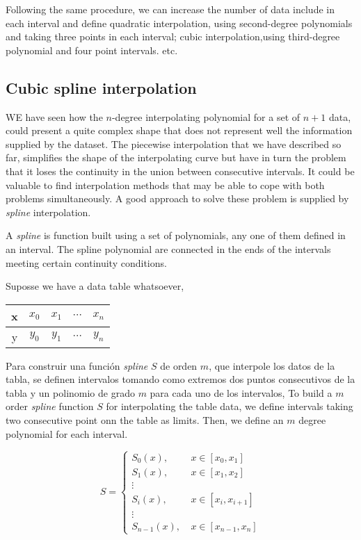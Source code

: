 \begin{paracol}{2}
Following the same procedure, we can increase the number of data include in each interval and define quadratic interpolation, using second-degree polynomials and taking three points in each interval; cubic interpolation,using  third-degree polynomial and four point intervals. etc.

\subsection{Cubic spline interpolation}
WE have seen how the $n$-degree interpolating polynomial for a set of $n+1$ data, could present a quite complex shape that does not represent well the information supplied by the dataset. The piecewise interpolation that we have described so far, simplifies the shape of the interpolating curve but have in turn the problem that it loses the continuity in the union between consecutive intervals. It could be valuable to find interpolation methods that may be able to cope with both problems simultaneously. A good approach to solve these problem is supplied by \emph{spline} interpolation. 

A \emph{spline} is function built using a set of polynomials, any one of them defined in an interval. The spline polynomial are connected in the ends of the intervals meeting certain continuity conditions.

Suposse we have a data table whatsoever,
\end{paracol}
\begin{table}[h]
\centering
\begin{tabular}{c|cccc}
x&$x_0$&$x_1$&$\cdots$&$x_n$\\
\hline
y&$y_0$&$y_1$&$\cdots$&$y_n$
\end{tabular}
\end{table}
\begin{paracol}{2}
Para construir una función \emph{spline} $S$ de orden $m$, que interpole los datos de la tabla, se definen intervalos tomando como extremos dos puntos consecutivos de la tabla y un polinomio de grado $m$ para cada uno de los intervalos,
\switchcolumn
To build a $m$ order \emph{spline} function $S$ for interpolating the table data, we define intervals taking two consecutive point onn the table as limits. Then, we define an $m$ degree polynomial for each interval.
\end{paracol}
\begin{equation*}
S= \left\{ 
\begin{aligned}
S_0(x),& \ x\in [x_0,x_1]\\
S_1(x),& \ x\in [x_1,x_2]\\
\vdots \\
S_i(x),& \ x\in [x_i,x_{i+1}]\\
\vdots \\
S_{n-1}(x),& \ x\in [x_{n-1},x_n]
\end{aligned}
\right.
\end{equation*}
